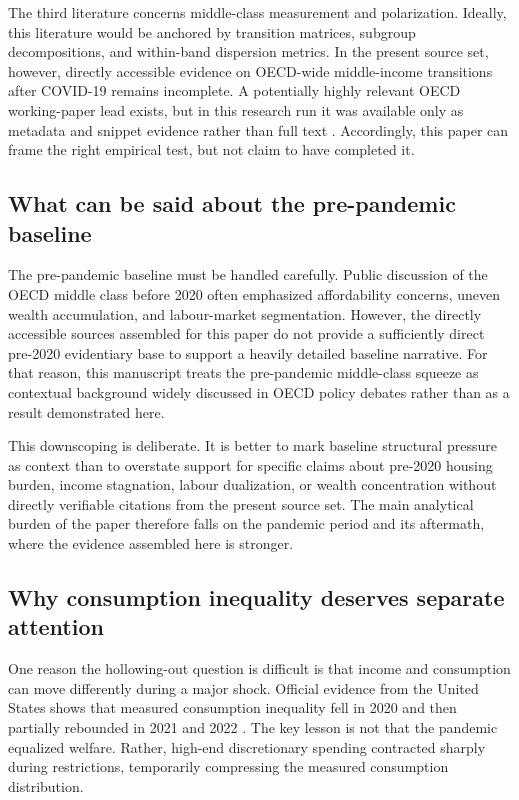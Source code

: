\documentclass[11pt]{article}
\begin{document}
The third literature concerns middle-class measurement and polarization. Ideally, this literature would be anchored by transition matrices, subgroup decompositions, and within-band dispersion metrics. In the present source set, however, directly accessible evidence on OECD-wide middle-income transitions after COVID-19 remains incomplete. A potentially highly relevant OECD working-paper lead exists, but in this research run it was available only as metadata and snippet evidence rather than full text \citep{oecdeconomicsdepar2023one}. Accordingly, this paper can frame the right empirical test, but not claim to have completed it.

\subsection{What can be said about the pre-pandemic baseline}
The pre-pandemic baseline must be handled carefully. Public discussion of the OECD middle class before 2020 often emphasized affordability concerns, uneven wealth accumulation, and labour-market segmentation. However, the directly accessible sources assembled for this paper do not provide a sufficiently direct pre-2020 evidentiary base to support a heavily detailed baseline narrative. For that reason, this manuscript treats the pre-pandemic middle-class squeeze as contextual background widely discussed in OECD policy debates rather than as a result demonstrated here.

This downscoping is deliberate. It is better to mark baseline structural pressure as context than to overstate support for specific claims about pre-2020 housing burden, income stagnation, labour dualization, or wealth concentration without directly verifiable citations from the present source set. The main analytical burden of the paper therefore falls on the pandemic period and its aftermath, where the evidence assembled here is stronger.

\subsection{Why consumption inequality deserves separate attention}
One reason the hollowing-out question is difficult is that income and consumption can move differently during a major shock. Official evidence from the United States shows that measured consumption inequality fell in 2020 and then partially rebounded in 2021 and 2022 \citep{consumptioninequal2024bls}. The key lesson is not that the pandemic equalized welfare. Rather, high-end discretionary spending contracted sharply during restrictions, temporarily compressing the measured consumption distribution.
\end{document}
